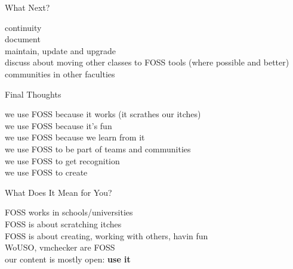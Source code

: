 \documentclass{simple}
\begin{document}
\begin{frame}{What Next?}
  \begin{center}
    {\large
      \pause continuity \\
      \vspace{0.3cm}
      \pause document \\
      \vspace{0.3cm}
      \pause maintain, update and upgrade \\
      \vspace{0.3cm}
      \pause discuss about moving other classes to FOSS tools (where possible
      and better) \\
      \vspace{0.3cm}
      \pause communities in other faculties
    }
  \end{center}
\end{frame}

\begin{frame}{Final Thoughts}
  \begin{center}
    {\large
      \pause we use FOSS because it works (it scrathes our itches) \\
      \vspace{0.3cm}
      \pause we use FOSS because it's fun \\
      \vspace{0.3cm}
      \pause we use FOSS because we learn from it \\
      \vspace{0.3cm}
      \pause we use FOSS to be part of teams and communities \\
      \vspace{0.3cm}
      \pause we use FOSS to get recognition \\
      \vspace{0.3cm}
      \pause we use FOSS to create
      \vspace{0.3cm}
    }
  \end{center}
\end{frame}

\begin{frame}{What Does It Mean for You?}
  \begin{center}
    {\large
      \pause FOSS works in schools/universities \\
      \vspace{0.3cm}
      \pause FOSS is about scratching itches \\
      \vspace{0.3cm}
      \pause FOSS is about creating, working with others, havin fun \\
      \vspace{0.3cm}
      \pause WoUSO, vmchecker are FOSS \\
      \vspace{0.3cm}
      \pause our content is mostly open: \textbf{use it}
    }
  \end{center}
\end{frame}
\end{document}

